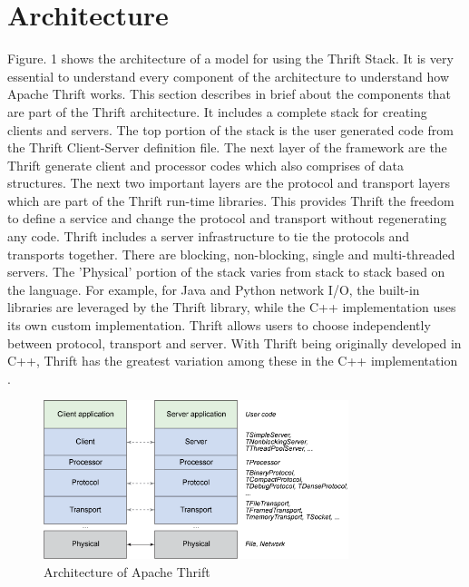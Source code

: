 \documentclass[9pt,twocolumn,twoside]{../../styles/osajnl}
\begin{document}

\section{Architecture}

Figure. 1
shows the architecture of a model for using the Thrift Stack. It is very
essential to understand every component of the architecture to understand how Apache Thrift works.
This section describes in brief about the components that are part of the Thrift architecture.
It includes a complete stack for creating clients and servers. The top portion of the stack is the user generated code from the Thrift Client-Server definition file. The next layer of the framework are the Thrift generate client and processor codes which also comprises of data structures. The next two important layers are the protocol and transport layers which are part of the Thrift run-time libraries. This provides Thrift the freedom to define a service and change the protocol and transport without regenerating any code. Thrift includes a server infrastructure to tie the protocols and transports together. There are blocking, non-blocking, single and multi-threaded servers. The 'Physical' portion of the stack varies from stack to stack based on the language. For example, for Java and Python network I/O, the built-in libraries are leveraged by the Thrift library, while the C++ implementation uses its own custom implementation. Thrift allows users to choose independently between protocol, transport and server. With Thrift being originally developed in C++, Thrift has the greatest variation among these in the C++ implementation \cite{www-thrift-example}.

\begin{figure}[h]
    \centering
    \includegraphics[width=3.5in]{images/thrift_arch.png}
    \caption{Architecture of Apache Thrift  \cite{www-thrift-arch}}
    \label{fig:thrift_arch}
\end{figure}
\end{document}
